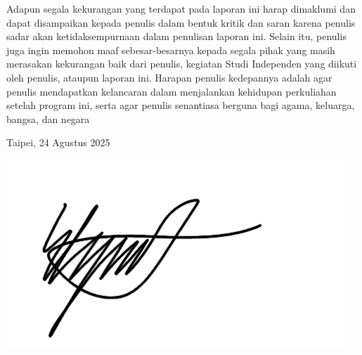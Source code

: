 Adapun segala kekurangan yang terdapat pada laporan ini harap dimaklumi
dan dapat disampaikan kepada penulis dalam bentuk kritik dan saran karena penulis
sadar akan ketidaksempurnaan dalam penulisan laporan ini. Selain itu, penulis juga
ingin memohon maaf sebesar-besarnya kepada segala pihak yang masih merasakan
kekurangan baik dari penulis, kegiatan Studi Independen yang diikuti oleh penulis,
ataupun laporan ini. Harapan penulis kedepannya adalah agar penulis mendapatkan
kelancaran dalam menjalankan kehidupan perkuliahan setelah program ini, serta
agar penulis senantiasa berguna bagi agama, keluarga, bangsa, dan negara

\vspace*{1cm}
\begin{flushright}
    Taipei, 24 Agustus 2025

    \vspace{0.5cm}
    
    \includegraphics[width=0.25\linewidth]{assets/TandaTangan.png}\\[0.5cm]

    \penulis

\end{flushright}